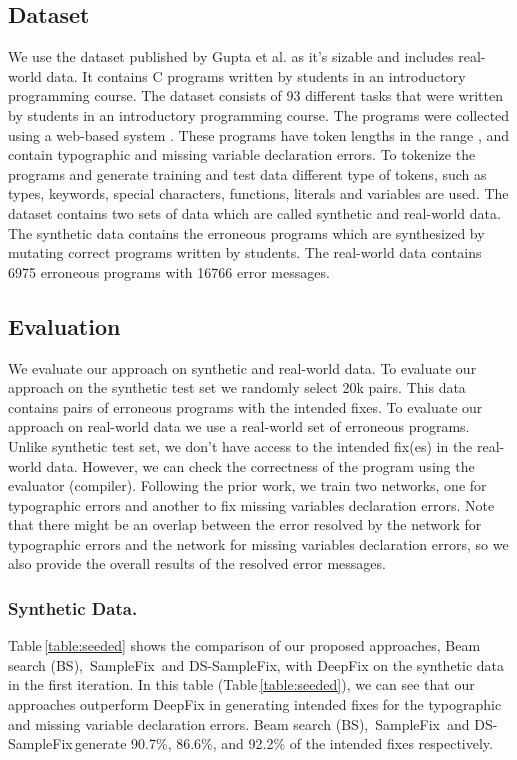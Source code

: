 \documentclass[runningheads]{llncs}
\newcommand{\samplefix}{SampleFix}
\newcommand{\dssmaplefix}{DS-SampleFix}
\newcommand{\tableref}{Table}
\begin{document}
\subsection{Dataset} 
We use the dataset published by Gupta et al. \cite{Gupta2017DeepFixFC} as it's sizable and includes real-world data. It contains C programs written by students in an introductory programming course. The dataset consists of 93 different tasks that were written by students in an introductory programming course. 
The programs were collected using a web-based system \cite{das16tutorin}. These programs have token lengths in the range , and 
contain typographic and missing variable declaration errors. To tokenize the programs and generate training and test data  different type of tokens, such as types, keywords, special characters, functions, literals and variables are used. The dataset contains two sets of data which are called synthetic and real-world data. The synthetic data contains the erroneous programs which are synthesized by mutating correct programs written by students. The real-world data contains 6975 erroneous programs with 16766 error messages.
\subsection{Evaluation}
\label{subsec:eval}


We evaluate our approach on synthetic and real-world data. To evaluate our approach on the synthetic test set we randomly select 20k pairs. This data contains pairs of erroneous programs with the intended fixes. To evaluate our approach on real-world data we use a real-world set of erroneous programs. Unlike synthetic test set, we don't have access to the intended fix(es) in the real-world data. However, we can check the correctness of the program using the evaluator (compiler). Following the prior work, we train two networks, one for typographic errors and another to fix missing variables declaration errors. Note that there might be an overlap between the error resolved by the network for typographic errors and the network for missing variables declaration errors, so we also provide the overall results of the resolved error messages. 

\subsubsection{Synthetic Data.} 
\tableref \,\ref{table:seeded} shows the comparison of our proposed approaches, Beam search (BS), \,\samplefix \, and \dssmaplefix, with DeepFix \cite{Gupta2017DeepFixFC} on the synthetic data in the first iteration. In this table (\tableref \,\ref{table:seeded}), we can see that our approaches outperform DeepFix in generating intended fixes for the typographic and missing variable declaration errors. Beam search (BS), \,\samplefix \, and \dssmaplefix \,generate 90.7\%, 86.6\%, and 92.2\% of the intended fixes 
respectively. 
\end{document}

